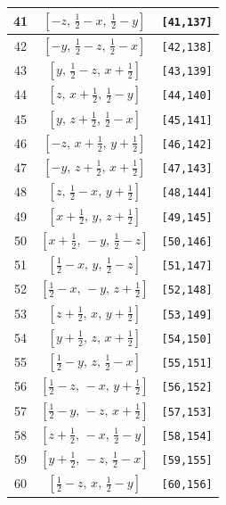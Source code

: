 \documentclass[fleqn,8pt]{jsarticle}
\begin{document}
\begin{longtable}{ccc}
41 & $\left[ - z,\, \frac{1}{2} - x,\, \frac{1}{2} - y \right]$ & {\tt [41,137]} \\ \hline
42 & $\left[ - y,\, \frac{1}{2} - z,\, \frac{1}{2} - x \right]$ & {\tt [42,138]} \\ \hline
43 & $\left[ y,\, \frac{1}{2} - z,\, x + \frac{1}{2} \right]$ & {\tt [43,139]} \\ \hline
44 & $\left[ z,\, x + \frac{1}{2},\, \frac{1}{2} - y \right]$ & {\tt [44,140]} \\ \hline
45 & $\left[ y,\, z + \frac{1}{2},\, \frac{1}{2} - x \right]$ & {\tt [45,141]} \\ \hline
46 & $\left[ - z,\, x + \frac{1}{2},\, y + \frac{1}{2} \right]$ & {\tt [46,142]} \\ \hline
47 & $\left[ - y,\, z + \frac{1}{2},\, x + \frac{1}{2} \right]$ & {\tt [47,143]} \\ \hline
48 & $\left[ z,\, \frac{1}{2} - x,\, y + \frac{1}{2} \right]$ & {\tt [48,144]} \\ \hline
49 & $\left[ x + \frac{1}{2},\, y,\, z + \frac{1}{2} \right]$ & {\tt [49,145]} \\ \hline
50 & $\left[ x + \frac{1}{2},\, - y,\, \frac{1}{2} - z \right]$ & {\tt [50,146]} \\ \hline
51 & $\left[ \frac{1}{2} - x,\, y,\, \frac{1}{2} - z \right]$ & {\tt [51,147]} \\ \hline
52 & $\left[ \frac{1}{2} - x,\, - y,\, z + \frac{1}{2} \right]$ & {\tt [52,148]} \\ \hline
53 & $\left[ z + \frac{1}{2},\, x,\, y + \frac{1}{2} \right]$ & {\tt [53,149]} \\ \hline
54 & $\left[ y + \frac{1}{2},\, z,\, x + \frac{1}{2} \right]$ & {\tt [54,150]} \\ \hline
55 & $\left[ \frac{1}{2} - y,\, z,\, \frac{1}{2} - x \right]$ & {\tt [55,151]} \\ \hline
56 & $\left[ \frac{1}{2} - z,\, - x,\, y + \frac{1}{2} \right]$ & {\tt [56,152]} \\ \hline
57 & $\left[ \frac{1}{2} - y,\, - z,\, x + \frac{1}{2} \right]$ & {\tt [57,153]} \\ \hline
58 & $\left[ z + \frac{1}{2},\, - x,\, \frac{1}{2} - y \right]$ & {\tt [58,154]} \\ \hline
59 & $\left[ y + \frac{1}{2},\, - z,\, \frac{1}{2} - x \right]$ & {\tt [59,155]} \\ \hline
60 & $\left[ \frac{1}{2} - z,\, x,\, \frac{1}{2} - y \right]$ & {\tt [60,156]} \\ \hline

\end{longtable}
\end{document}
